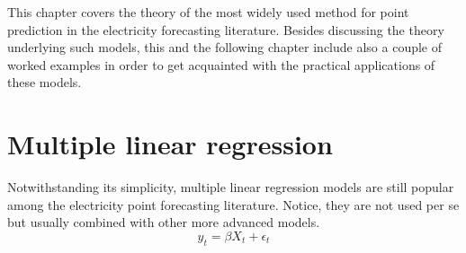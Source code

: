 This chapter covers the theory of the most widely used method for point prediction in the electricity forecasting literature. Besides discussing the theory underlying such models, this and the following chapter include also a couple of worked examples in order to get acquainted with the practical applications of these models.




\section{Multiple linear regression}
Notwithstanding its simplicity, multiple linear regression models are still popular among the electricity point forecasting literature. Notice, they are not used per se but usually combined with other more advanced models.
\begin{equation}
    y_t=\beta X_t + \epsilon_t
\end{equation}

